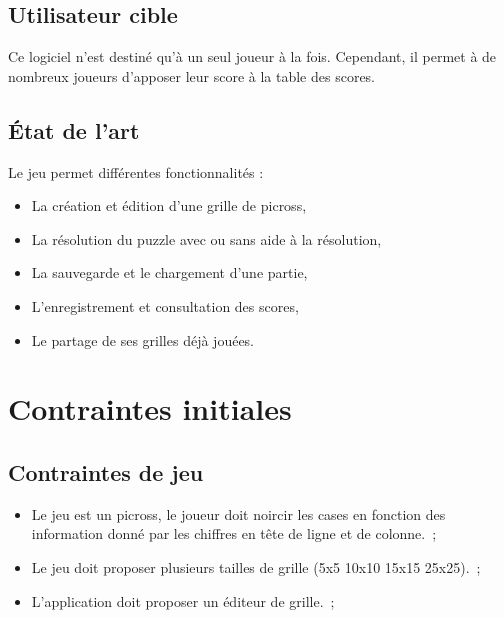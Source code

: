 \documentclass[11pt]{article}
\begin{document}
\subsection{Utilisateur cible}

Ce logiciel n'est destiné qu'à un seul joueur à la fois. Cependant, il permet à de nombreux joueurs d'apposer leur score à la table des scores.


\subsection{État de l'art}

Le jeu permet différentes fonctionnalités :
\begin{itemize}
   \item La création et édition d'une grille de picross,
   \item La résolution du puzzle avec ou sans aide à la résolution,
   \item La sauvegarde et le chargement d'une partie,
   \item L'enregistrement et consultation des scores,
   \item Le partage de ses grilles déjà jouées.
\end{itemize}




\section{Contraintes initiales}


\subsection{Contraintes de jeu}


\begin{itemize}
   \item Le jeu est un picross, le joueur doit noircir les cases en fonction des information donné par les chiffres en
       tête de ligne et de colonne.~;
   \item Le jeu doit proposer plusieurs tailles de grille (5x5 10x10 15x15 25x25).~;
   \item L'application doit proposer un éditeur de grille.~;
\end{itemize}
\end{document}
